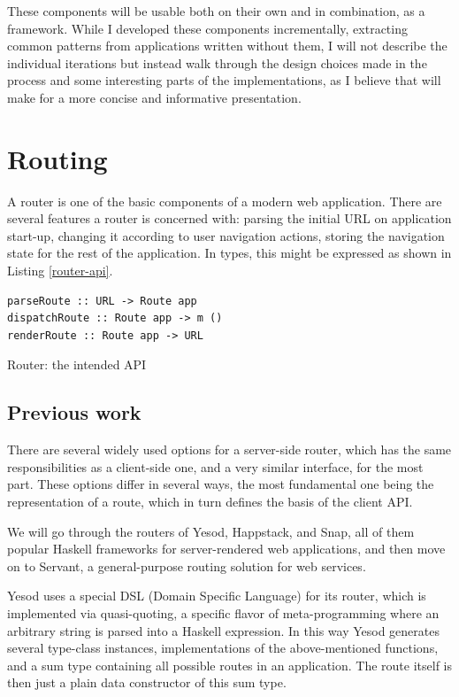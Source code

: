 \documentclass[english,zadani,odsaz]{fitthesis}
\begin{document}
These components will be usable both on their own and in combination, as a
framework. While I developed these components incrementally, extracting common
patterns from applications written without them, I will not describe the
individual iterations but instead walk through the design choices made in the
process and some interesting parts of the implementations, as I believe that
will make for a more concise and informative presentation.

\section{Routing}
\label{sec:org487d75e}
A router is one of the basic components of a modern web application. There are
several features a router is concerned with: parsing the initial URL on
application start-up, changing it according to user navigation actions, storing
the navigation state for the rest of the application. In types, this might be
expressed as shown in Listing \ref{router-api}.

\begin{listing}[!bp]
\begin{verbatim}
parseRoute :: URL -> Route app
dispatchRoute :: Route app -> m ()
renderRoute :: Route app -> URL
\end{verbatim}
\caption{Router: the intended API \label{router-api}}
\end{listing}

\subsection{Previous work}
\label{sec:orgd89ee83}
There are several widely used options for a server-side router, which has the
same responsibilities as a client-side one, and a very similar interface, for
the most part. These options differ in several ways, the most fundamental one
being the representation of a route, which in turn defines the basis of the
client API.

We will go through the routers of Yesod, Happstack, and Snap, all of them
popular Haskell frameworks for server-rendered web applications, and then move
on to Servant, a general-purpose routing solution for web services.

Yesod uses a special DSL (Domain Specific Language) for its router, which is
implemented via quasi-quoting, a specific flavor of meta-programming where an
arbitrary string is parsed into a Haskell expression. In this way Yesod
generates several type-class instances, implementations of the above-mentioned
functions, and a sum type containing all possible routes in an application. The
route itself is then just a plain data constructor of this sum type.
\end{document}
